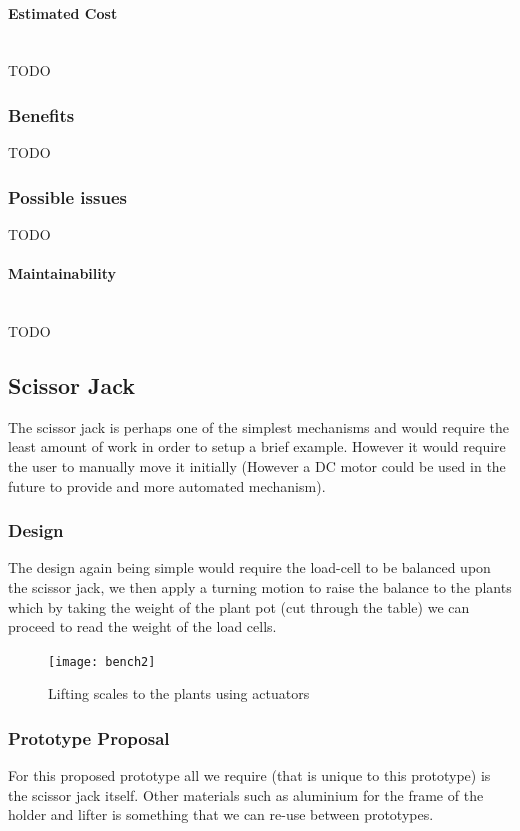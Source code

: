 \documentclass[11pt]{article}
\begin{document}
\paragraph{Estimated Cost} \mbox{}\\
TODO
\subsubsection{Benefits}
TODO
\subsubsection{Possible issues}
TODO
\paragraph{Maintainability}\mbox{}\\
TODO

\subsection{Scissor Jack}
The scissor jack is perhaps one of the simplest mechanisms and would require the least amount of work in order to setup a
brief example. However it would require the user to manually move it initially (However a DC motor could be used in the
future to provide and more automated mechanism). 
\subsubsection{Design}
The design again being simple would require the load-cell to be balanced upon the scissor jack, we then apply a turning
motion to raise the balance to the plants which by taking the weight of the plant pot (cut through the table) we can proceed
to read the weight of the load cells. 

\begin{figure}[H]
  \begin{center}
    \texttt{[image: bench2]}
    \caption{Lifting scales to the plants using actuators}
  \end{center}
\end{figure}


\subsubsection{Prototype Proposal}
For this proposed prototype all we require (that is unique to this prototype) is the scissor jack itself. Other materials
such as aluminium for the frame of the holder and lifter is something that we can re-use between prototypes. 
\end{document}
